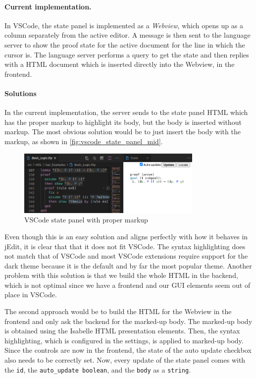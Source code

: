 \paragraph{Current implementation.}
In VSCode, the state panel is implemented as a \emph{Webview}, which opens up as a column separately from the active editor. A message is then sent to the language server to show the proof state for the active document for the line in which the cursor is. The language server performs a query to get the state and then replies with a HTML document which is inserted directly into the Webview, in the frontend.

\paragraph{Solutions}
In the current implementation, the server sends to the state panel HTML which has the proper markup to highlight its body, but the body is inserted without markup. The most obvious solution would be to just insert the body with the markup, as shown in \autoref{fig:vscode_state_panel_mid}.
 
\begin{figure}[htpb]
    \centering
    \includegraphics[width=0.8\textwidth]{figures/problem1/vscode_state_panel_mid.png}
    \caption{VSCode state panel with proper markup} \label{fig:vscode_state_panel_mid}
\end{figure}

Even though this is an easy solution and aligns perfectly with how it behaves in jEdit, it is clear that that it does not fit VSCode. The syntax highlighting does not match that of VSCode and most VSCode extensions require support for the dark theme because it is the default and by far the most popular theme.
Another problem with this solution is that we build the whole HTML in the backend, which is not optimal since we have a frontend and our GUI elements seem out of place in VSCode.

The second approach would be to build the HTML for the Webview in the frontend and only ask the backend for the marked-up body. The marked-up body is obtained using the Isabelle HTML presentation elements. Then, the syntax highlighting, which is configured in the settings, is applied to marked-up body. Since the controls are now in the frontend, the state of the auto update checkbox also needs to be correctly set. Now, every update of the state panel comes with the \texttt{id}, the \texttt{auto\_update boolean}, and the \texttt{body} as a \texttt{string}.

